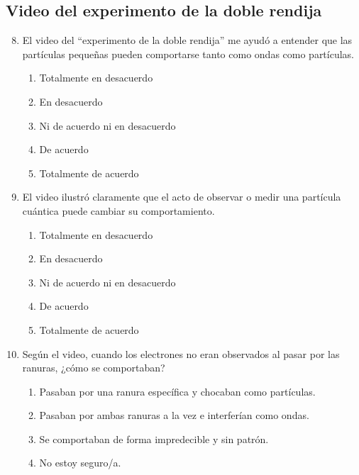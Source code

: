 \documentclass[10pt,a4paper]{article}
\begin{document}
\subsection{Video del experimento de la doble rendija}
\begin{enumerate}
    \setcounter{enumi}{7} %
    \item El video del ``experimento de la doble rendija'' me ayudó a entender que las partículas pequeñas pueden comportarse tanto como ondas como partículas.
    \begin{enumerate}[label=\alph*)]
        \item Totalmente en desacuerdo
        \item En desacuerdo
        \item Ni de acuerdo ni en desacuerdo
        \item De acuerdo
        \item Totalmente de acuerdo
    \end{enumerate}
    
    \item El video ilustró claramente que el acto de observar o medir una partícula cuántica puede cambiar su comportamiento.
    \begin{enumerate}[label=\alph*)]
        \item Totalmente en desacuerdo
        \item En desacuerdo
        \item Ni de acuerdo ni en desacuerdo
        \item De acuerdo
        \item Totalmente de acuerdo
    \end{enumerate}
    
    \item Según el video, cuando los electrones no eran observados al pasar por las ranuras, ¿cómo se comportaban?
    \begin{enumerate}[label=\alph*)]
        \item Pasaban por una ranura específica y chocaban como partículas.
        \item Pasaban por ambas ranuras a la vez e interferían como ondas.
        \item Se comportaban de forma impredecible y sin patrón.
        \item No estoy seguro/a.
    \end{enumerate}
\end{enumerate}
\end{document}

